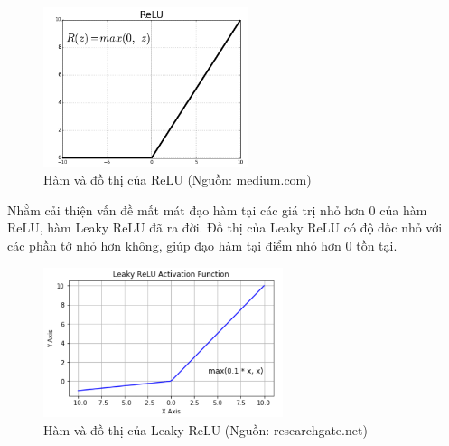 {    \begin{figure}[H]
    \centering
    \includegraphics[width=6cm] {images/relu.png}
    \caption{Hàm và đồ thị của ReLU (Nguồn: medium.com)}
    \label{fig:relu_layer}
    \end{figure}

    Nhằm cải thiện vấn đề mất mát đạo hàm tại các giá trị nhỏ hơn 0 của hàm ReLU, hàm Leaky ReLU đã ra đời. Đồ thị của Leaky ReLU có độ dốc nhỏ với các phần tớ nhỏ hơn không, giúp đạo hàm tại điểm nhỏ hơn 0 tồn tại.
    
    \begin{figure}[H]
    \centering
    \includegraphics[width=7cm] {images/leaky.png}
    \caption{Hàm và đồ thị của Leaky ReLU (Nguồn: researchgate.net)}
    \label{fig:leaky_layer}
    \end{figure}
    
}
